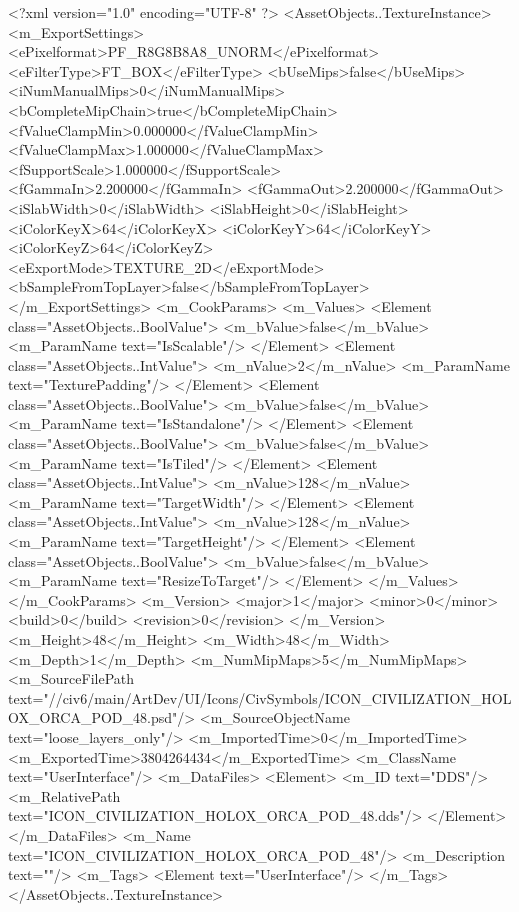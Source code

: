 <?xml version="1.0" encoding="UTF-8" ?>
<AssetObjects..TextureInstance>
	<m_ExportSettings>
		<ePixelformat>PF_R8G8B8A8_UNORM</ePixelformat>
		<eFilterType>FT_BOX</eFilterType>
		<bUseMips>false</bUseMips>
		<iNumManualMips>0</iNumManualMips>
		<bCompleteMipChain>true</bCompleteMipChain>
		<fValueClampMin>0.000000</fValueClampMin>
		<fValueClampMax>1.000000</fValueClampMax>
		<fSupportScale>1.000000</fSupportScale>
		<fGammaIn>2.200000</fGammaIn>
		<fGammaOut>2.200000</fGammaOut>
		<iSlabWidth>0</iSlabWidth>
		<iSlabHeight>0</iSlabHeight>
		<iColorKeyX>64</iColorKeyX>
		<iColorKeyY>64</iColorKeyY>
		<iColorKeyZ>64</iColorKeyZ>
		<eExportMode>TEXTURE_2D</eExportMode>
		<bSampleFromTopLayer>false</bSampleFromTopLayer>
	</m_ExportSettings>
	<m_CookParams>
		<m_Values>
			<Element class="AssetObjects..BoolValue">
				<m_bValue>false</m_bValue>
				<m_ParamName text="IsScalable"/>
			</Element>
			<Element class="AssetObjects..IntValue">
				<m_nValue>2</m_nValue>
				<m_ParamName text="TexturePadding"/>
			</Element>
			<Element class="AssetObjects..BoolValue">
				<m_bValue>false</m_bValue>
				<m_ParamName text="IsStandalone"/>
			</Element>
			<Element class="AssetObjects..BoolValue">
				<m_bValue>false</m_bValue>
				<m_ParamName text="IsTiled"/>
			</Element>
			<Element class="AssetObjects..IntValue">
				<m_nValue>128</m_nValue>
				<m_ParamName text="TargetWidth"/>
			</Element>
			<Element class="AssetObjects..IntValue">
				<m_nValue>128</m_nValue>
				<m_ParamName text="TargetHeight"/>
			</Element>
			<Element class="AssetObjects..BoolValue">
				<m_bValue>false</m_bValue>
				<m_ParamName text="ResizeToTarget"/>
			</Element>
		</m_Values>
	</m_CookParams>
	<m_Version>
		<major>1</major>
		<minor>0</minor>
		<build>0</build>
		<revision>0</revision>
	</m_Version>
	<m_Height>48</m_Height>
	<m_Width>48</m_Width>
	<m_Depth>1</m_Depth>
	<m_NumMipMaps>5</m_NumMipMaps>
	<m_SourceFilePath text="//civ6/main/ArtDev/UI/Icons/CivSymbols/ICON_CIVILIZATION_HOLOX_ORCA_POD_48.psd"/>
	<m_SourceObjectName text="loose_layers_only"/>
	<m_ImportedTime>0</m_ImportedTime>
	<m_ExportedTime>3804264434</m_ExportedTime>
	<m_ClassName text="UserInterface"/>
	<m_DataFiles>
		<Element>
			<m_ID text="DDS"/>
			<m_RelativePath text="ICON_CIVILIZATION_HOLOX_ORCA_POD_48.dds"/>
		</Element>
	</m_DataFiles>
	<m_Name text="ICON_CIVILIZATION_HOLOX_ORCA_POD_48"/>
	<m_Description text=""/>
	<m_Tags>
		<Element text="UserInterface"/>
	</m_Tags>
</AssetObjects..TextureInstance>

